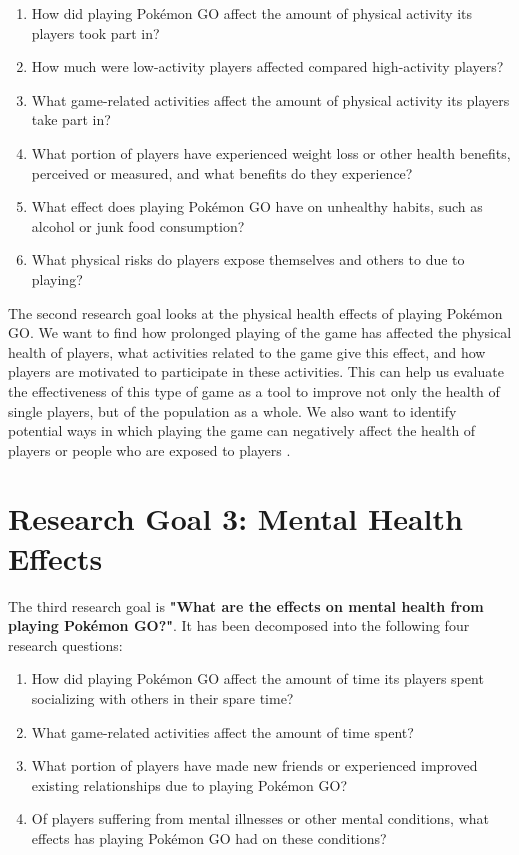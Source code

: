 \begin{enumerate}[label=RQ2.{\arabic*}]
	\item How did playing Pokémon GO affect the amount of physical activity its players took part in?\label{rq-physical-activity-amount}
	\item How much were low-activity players affected compared high-activity players?\label{rq-physical-high-low-comparison}
	\item What game-related activities affect the amount of physical activity its players take part in?\label{rq-physical-game-activities}
	\item What portion of players have experienced weight loss or other health benefits, perceived or measured, and what benefits do they experience?\label{rq-physical-weight-loss}
	\item What effect does playing Pokémon GO have on unhealthy habits, such as alcohol or junk food consumption?\label{rq-physical-unhealthy-habits}
	\item What physical risks do players expose themselves and others to due to playing?\label{rq-physical-risks}
\end{enumerate}

The second research goal looks at the physical health effects of playing Pokémon GO. We want to find how prolonged playing of the game has affected the physical health of players, what activities related to the game give this effect, and how players are motivated to participate in these activities. This can help us evaluate the effectiveness of this type of game as a tool to improve not only the health of single players, but of the population as a whole. We also want to identify potential ways in which playing the game can negatively affect the health of players or people who are exposed to players .

\section{Research Goal 3: Mental Health Effects}
\label{rg3}

The third research goal is \textbf{"What are the effects on mental health from playing Pokémon GO?"}. It has been decomposed into the following four research questions:

\begin{enumerate}[label=RQ3.{\arabic*}]
	\item How did playing Pokémon GO affect the amount of time its players spent socializing with others in their spare time?\label{rq-mental-social-activity-amount}
	\item What game-related activities affect the amount of time spent?\label{rq-mental-game-activities}
	\item What portion of players have made new friends or experienced improved existing relationships due to playing Pokémon GO?\label{rq-mental-relationships}
	\item Of players suffering from mental illnesses or other mental conditions, what effects has playing Pokémon GO had on these conditions?\label{rq-mental-illnesses}
\end{enumerate}

